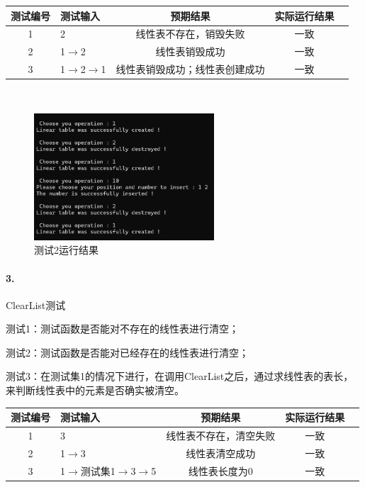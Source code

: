\documentclass[supercite]{Experimental_Report}
\theoremstyle{definition}
\begin{document}
\begin{tabular}{|c|l|c|c|c|}
	\hline
	测试编号 & 测试输入 & 预期结果 & 实际运行结果 \\
	\hline
	1 & 2 & 线性表不存在，销毁失败 & 一致 \\
	\hline
	2 & 1$\rightarrow$2 & 线性表销毁成功 & 一致 \\
	\hline
	3 & 1$\rightarrow$2$\rightarrow$1 & 线性表销毁成功；线性表创建成功 & 一致 \\
	\hline
\end{tabular}

~\

 \begin{figure}[H]
 	\centering
 	\includegraphics[width=0.6\textwidth]{images/线性表测试2.png}
 	\caption{测试2运行结果}
 	\label{txlab}
 \end{figure}


\paragraph{ 3.}ClearList测试

测试1：测试函数是否能对不存在的线性表进行清空；

测试2：测试函数是否能对已经存在的线性表进行清空；

测试3：在测试集1的情况下进行，在调用ClearList之后，通过求线性表的表长，来判断线性表中的元素是否确实被清空。

\vspace{0.5em}

\begin{tabular}{|c|l|c|c|c|}
	\hline
	测试编号 & 测试输入 & 预期结果 & 实际运行结果 \\
	\hline
	1 & 3 & 线性表不存在，清空失败 & 一致 \\
	\hline
	2 & 1$\rightarrow$3 & 线性表清空成功 & 一致 \\
	\hline
	3 & 1$\rightarrow$测试集1$\rightarrow$3$\rightarrow$5 & 线性表长度为0 & 一致 \\
	\hline
\end{tabular}
\end{document}
